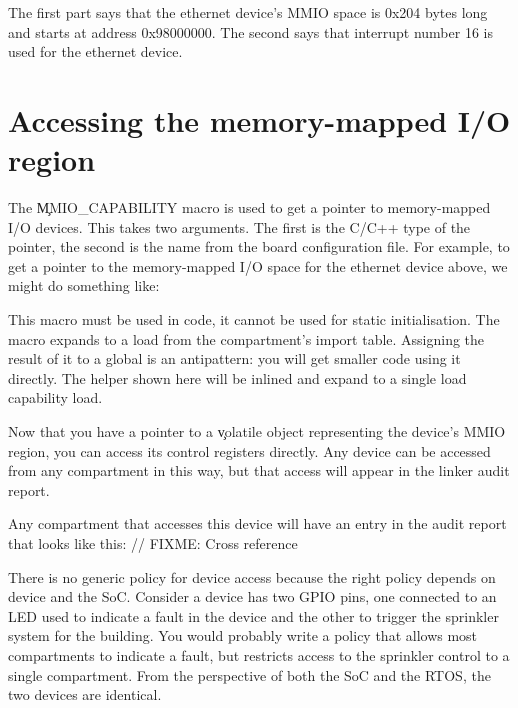 The first part says that the ethernet device's MMIO space is 0x204 bytes long and starts at address 0x98000000.
The second says that interrupt number 16 is used for the ethernet device.

\section[label=mmio_capabilities]{Accessing the memory-mapped I/O region}

The \c{MMIO_CAPABILITY} macro is used to get a pointer to memory-mapped I/O devices.
This takes two arguments.
The first is the C/C++ type of the pointer, the second is the name from the board configuration file.
For example, to get a pointer to the memory-mapped I/O space for the ethernet device above, we might do something like:

\begin{cxxsnippet}
struct EthernetMMIO
{
    // Control register layout here:
    ...
\};

__always_inline volatile struct EthernetMMIO *ethernet_device()
{
    return MMIO_CAPABILITY(struct EthernetMMIO, ethernet);
\}
\end{cxxsnippet}

\begin{note}
This macro must be used in code, it cannot be used for static initialisation.
The macro expands to a load from the compartment's import table.
Assigning the result of it to a global is an antipattern: you will get smaller code using it directly.
The helper shown here will be inlined and expand to a single load capability load.
\end{note}


Now that you have a pointer to a \c{volatile} object representing the device's MMIO region, you can access its control registers directly.
Any device can be accessed from any compartment in this way, but that access will appear in the linker audit report.


Any compartment that accesses this device will have an entry in the audit report that looks like this:
// FIXME: Cross reference

\begin{jsonsnippet}
        {
          "kind": "MMIO",
          "length": 516,
          "start": 2550136832
        \},
\end{jsonsnippet}

\begin{note}
There is no generic policy for device access because the right policy depends on device and the SoC.
Consider a device has two GPIO pins, one connected to an LED used to indicate a fault in the device and the other to trigger the sprinkler system for the building.
You would probably write a policy that allows most compartments to indicate a fault, but restricts access to the sprinkler control to a single compartment.
From the perspective of both the SoC and the RTOS, the two devices are identical.
\end{note}

